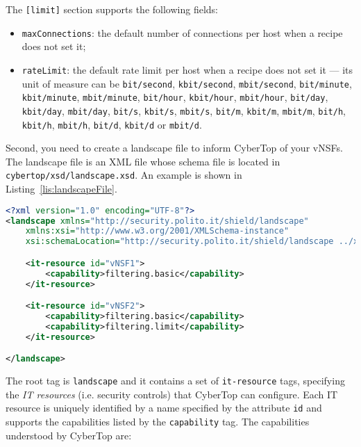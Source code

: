 \documentclass{scrartcl}
\newcommand{\ie}{i.e.\xspace}
\begin{document}
The \lstinline|[limit]| section supports the following fields:

\begin{itemize}
	\item \lstinline|maxConnections|: the default number of connections per host when a recipe does not set it;
	\item \lstinline|rateLimit|: the default rate limit per host when a recipe does not set it --- its unit of measure can be \lstinline|bit/second|, \lstinline|kbit/second|, \lstinline|mbit/second|, \lstinline|bit/minute|, \lstinline|kbit/minute|, \lstinline|mbit/minute|, \lstinline|bit/hour|, \lstinline|kbit/hour|, \lstinline|mbit/hour|, \lstinline|bit/day|, \lstinline|kbit/day|, \lstinline|mbit/day|, \lstinline|bit/s|, \lstinline|kbit/s|, \lstinline|mbit/s|, \lstinline|bit/m|, \lstinline|kbit/m|, \lstinline|mbit/m|, \lstinline|bit/h|, \lstinline|kbit/h|, \lstinline|mbit/h|, \lstinline|bit/d|, \lstinline|kbit/d| or \lstinline|mbit/d|.
\end{itemize}

Second, you need to create a landscape file to inform CyberTop of your vNSFs. The landscape file is an XML file whose schema file is located in \lstinline|cybertop/xsd/landscape.xsd|. An example is shown in Listing~\ref{lis:landscapeFile}.

\begin{lstlisting}[language = XML, caption = Example of landscape file., label = lis:landscapeFile]
<?xml version="1.0" encoding="UTF-8"?>
<landscape xmlns="http://security.polito.it/shield/landscape"
	xmlns:xsi="http://www.w3.org/2001/XMLSchema-instance"
	xsi:schemaLocation="http://security.polito.it/shield/landscape ../xsd/landscape.xsd ">

	<it-resource id="vNSF1">
		<capability>filtering.basic</capability>
	</it-resource>

	<it-resource id="vNSF2">
		<capability>filtering.basic</capability>
		<capability>filtering.limit</capability>
	</it-resource>

</landscape>
\end{lstlisting}

The root tag is \lstinline|landscape| and it contains a set of \lstinline|it-resource| tags, specifying the \emph{IT resources} (\ie security controls) that CyberTop can configure. Each IT resource is uniquely identified by a name specified by the attribute \lstinline|id| and supports the capabilities listed by the \lstinline|capability| tag. The capabilities understood by CyberTop are:
\end{document}
